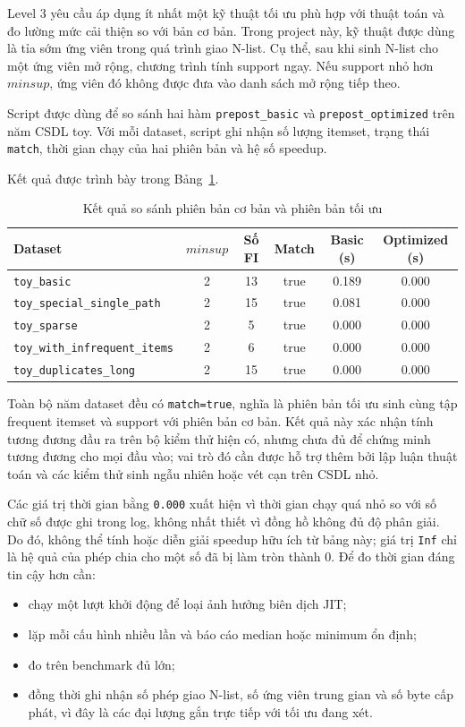 Level 3 yêu cầu áp dụng ít nhất một kỹ thuật tối ưu phù hợp với thuật toán và đo lường mức cải thiện so với bản cơ bản. Trong project này, kỹ thuật được dùng là tỉa sớm ứng viên trong quá trình giao N-list. Cụ thể, sau khi sinh N-list cho một ứng viên mở rộng, chương trình tính support ngay. Nếu support nhỏ hơn $\mathit{minsup}$, ứng viên đó không được đưa vào danh sách mở rộng tiếp theo.

Script  được dùng để so sánh hai hàm
\texttt{prepost\_basic} và \texttt{prepost\_optimized} trên năm CSDL toy.
Với mỗi dataset, script ghi nhận số lượng itemset, trạng thái
\texttt{match}, thời gian chạy của hai phiên bản và hệ số speedup.


Kết quả được trình bày trong Bảng~\ref{tab:optimization-check-results}.

\begin{table}[H]
\centering
\caption{Kết quả so sánh phiên bản cơ bản và phiên bản tối ưu}
\label{tab:optimization-check-results}
\begin{tabular}{lccccc}
\toprule
Dataset & $\mathit{minsup}$ & Số FI & Match & Basic (s) & Optimized (s) \\
\midrule
\texttt{toy\_basic} & 2 & 13 & true & 0.189 & 0.000 \\
\texttt{toy\_special\_single\_path} & 2 & 15 & true & 0.081 & 0.000 \\
\texttt{toy\_sparse} & 2 & 5 & true & 0.000 & 0.000 \\
\texttt{toy\_with\_infrequent\_items} & 2 & 6 & true & 0.000 & 0.000 \\
\texttt{toy\_duplicates\_long} & 2 & 15 & true & 0.000 & 0.000 \\
\bottomrule
\end{tabular}
\end{table}

Toàn bộ năm dataset đều có \texttt{match=true}, nghĩa là phiên bản tối ưu
sinh cùng tập frequent itemset và support với phiên bản cơ bản. Kết quả này xác
nhận tính tương đương đầu ra trên bộ kiểm thử hiện có, nhưng chưa đủ để chứng
minh tương đương cho mọi đầu vào; vai trò đó cần được hỗ trợ thêm bởi lập luận
thuật toán và các kiểm thử sinh ngẫu nhiên hoặc vét cạn trên CSDL nhỏ.

Các giá trị thời gian bằng \texttt{0.000} xuất hiện vì thời gian chạy quá nhỏ so
với số chữ số được ghi trong log, không nhất thiết vì đồng hồ không đủ độ phân
giải. Do đó, không thể tính hoặc diễn giải speedup hữu ích từ bảng này; giá trị
\texttt{Inf} chỉ là hệ quả của phép chia cho một số đã bị làm tròn thành 0.
Để đo thời gian đáng tin cậy hơn cần:
\begin{itemize}
    \item chạy một lượt khởi động để loại ảnh hưởng biên dịch JIT;
    \item lặp mỗi cấu hình nhiều lần và báo cáo median hoặc minimum ổn định;
    \item đo trên benchmark đủ lớn;
    \item đồng thời ghi nhận số phép giao N-list, số ứng viên trung gian và số
          byte cấp phát, vì đây là các đại lượng gắn trực tiếp với tối ưu đang xét.
\end{itemize}

